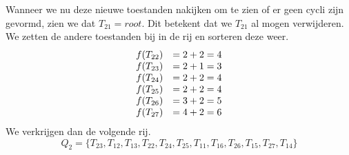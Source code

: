 \documentclass[alternative-exam.tex]{subfiles}
\begin{document}
Wanneer we nu deze nieuwe toestanden nakijken om te zien of er geen cycli zijn gevormd, zien we dat $T_{21} = root$. Dit betekent dat we $T_{21}$ al mogen verwijderen. We zetten de andere toestanden bij in de rij en sorteren deze weer.
\[
\begin{array}{c c}
f(T_{22}) &= 2+ 2 = 4\\
f(T_{23}) &= 2+ 1 = 3\\
f(T_{24}) &= 2+ 2 = 4\\
f(T_{25}) &= 2+ 2 = 4\\
f(T_{26}) &= 3+ 2 = 5\\
f(T_{27}) &= 4+ 2 = 6\\
\end{array}
\]
We verkrijgen dan de volgende rij.
\[
Q_2 = \{T_{23}, T_{12}, T_{13}, T_{22}, T_{24}, T_{25}, T_{11}, T_{16}, T_{26}, T_{15}, T_{27}, T_{14}\}
\]
\end{document}
